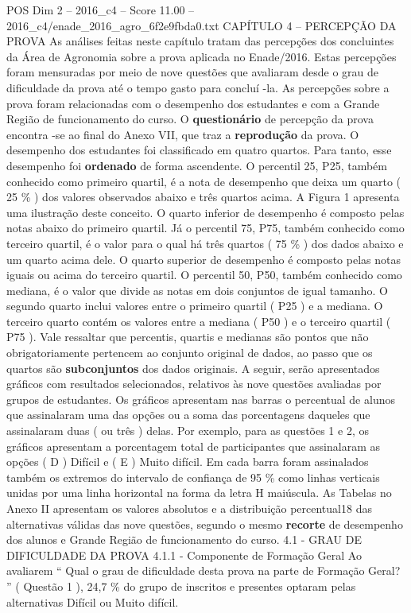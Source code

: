 \begin{textsample}{POS Dim 2 – 2016\_c4 – Score 11.00 – 2016\_c4/enade\_2016\_agro\_6f2e9fbda0.txt}  \label{ex:f2_pos_079}
CAPÍTULO 4 – PERCEPÇÃO DA PROVA As análises feitas neste capítulo tratam das percepções dos concluintes da Área de Agronomia sobre a prova aplicada no Enade/2016.
Estas percepções foram mensuradas por meio de nove questões que avaliaram desde o grau de dificuldade da prova até o tempo gasto para concluí -la.
As percepções sobre a prova foram relacionadas com o desempenho dos estudantes e com a Grande Região de funcionamento do curso.
O \textbf{questionário} de percepção da prova encontra -se ao final do Anexo VII, que traz a \textbf{reprodução} da prova.
O desempenho dos estudantes foi classificado em quatro quartos.
Para tanto, esse desempenho foi \textbf{ordenado} de forma ascendente.
O percentil 25, P25, também conhecido como primeiro quartil, é a nota de desempenho que deixa um quarto ( 25 \% ) dos valores observados abaixo e três quartos acima.
A Figura 1 apresenta uma ilustração deste conceito.
O quarto inferior de desempenho é composto pelas notas abaixo do primeiro quartil.
Já o percentil 75, P75, também conhecido como terceiro quartil, é o valor para o qual há três quartos ( 75 \% ) dos dados abaixo e um quarto acima dele.
O quarto superior de desempenho é composto pelas notas iguais ou acima do terceiro quartil.
O percentil 50, P50, também conhecido como mediana, é o valor que divide as notas em dois conjuntos de igual tamanho.
O segundo quarto inclui valores entre o primeiro quartil ( P25 ) e a mediana.
O terceiro quarto contém os valores entre a mediana ( P50 ) e o terceiro quartil ( P75 ).
Vale ressaltar que percentis, quartis e medianas são pontos que não obrigatoriamente pertencem ao conjunto original de dados, ao passo que os quartos são \textbf{subconjuntos} dos dados originais.
A seguir, serão apresentados gráficos com resultados selecionados, relativos às nove questões avaliadas por grupos de estudantes.
Os gráficos apresentam nas barras o percentual de alunos que assinalaram uma das opções ou a soma das porcentagens daqueles que assinalaram duas ( ou três ) delas.
Por exemplo, para as questões 1 e 2, os gráficos apresentam a porcentagem total de participantes que assinalaram as opções ( D ) Difícil e ( E ) Muito difícil.
Em cada barra foram assinalados também os extremos do intervalo de confiança de 95 \% como linhas verticais unidas por uma linha horizontal na forma da letra H maiúscula.
As Tabelas no Anexo II apresentam os valores absolutos e a distribuição percentual18 das alternativas válidas das nove questões, segundo o mesmo \textbf{recorte} de desempenho dos alunos e Grande Região de funcionamento do curso. 4.1 - GRAU DE DIFICULDADE DA PROVA 4.1.1 - Componente de Formação Geral Ao avaliarem “ Qual o grau de dificuldade desta prova na parte de Formação Geral? ” ( Questão 1 ), 24,7 \% do grupo de inscritos e presentes optaram pelas alternativas Difícil ou Muito difícil.

\end{textsample}
